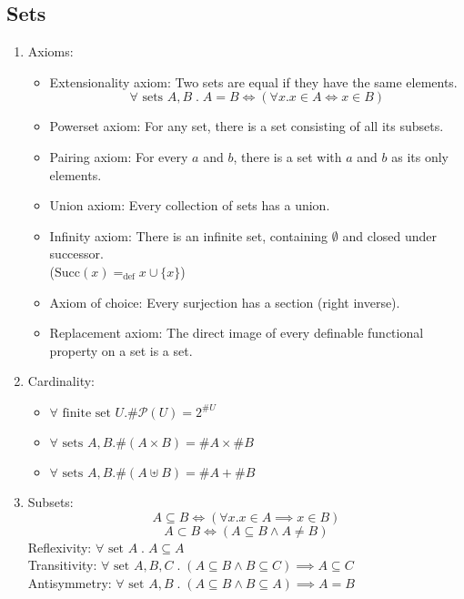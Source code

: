 \documentclass{article}
\begin{document}
\subsection{Sets}
\begin{enumerate}
    \item Axioms:
        \begin{itemize}[topsep=0pt]
            \item Extensionality axiom: Two sets are equal if they have the same elements.
                $$\forall\text{ sets }A, B\;.\;A=B\Longleftrightarrow(\forall x.x\in A\Longleftrightarrow x\in B)$$
            \item Powerset axiom: For any set, there is a set consisting of all its subsets.
            \item Pairing axiom: For every $a$ and $b$, there is a set with $a$ and $b$ as its only elements.
            \item Union axiom: Every collection of sets has a union.
            \item Infinity axiom: There is an infinite set, containing $\emptyset$ and closed under successor. \\($\text{Succ}(x)=_\text{def}x\cup\{x\}$)
            \item Axiom of choice: Every surjection has a section (right inverse).
            \item Replacement axiom: The direct image of every definable functional property on a set is a set.
        \end{itemize}
    \item Cardinality:
        \begin{itemize}[topsep=0pt]
            \item $\forall\text{ finite set }U.\#\mathcal{P}(U)=2^{\#U}$
            \item $\forall\text{ sets }A,B.\#(A\times B)=\#A\times\#B$
            \item $\forall\text{ sets }A,B.\#(A\uplus B)=\#A+\#B$
        \end{itemize}
    \item Subsets:
        $$A\subseteq B\Longleftrightarrow(\forall x.x\in A\implies x\in B)$$
        $$A\subset B\Longleftrightarrow(A\subseteq B\wedge A\neq B)$$
        Reflexivity: $\forall\text{ set }A\;.\;A\subseteq A$\\
        Transitivity: $\forall\text{ set }A,B,C\;.\;(A\subseteq B\wedge B\subseteq C)\implies A\subseteq C$\\
        Antisymmetry: $\forall\text{ set }A,B\;.\;(A\subseteq B\wedge B\subseteq A)\implies A=B$

\end{enumerate}
\end{document}
